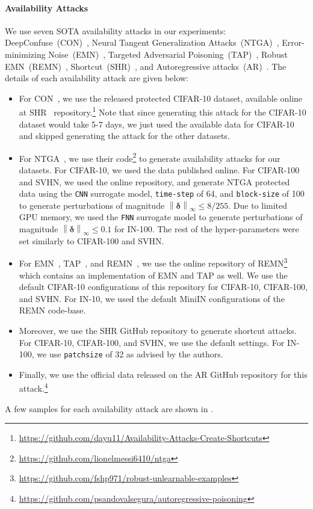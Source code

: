\documentclass[conference]{IEEEtran}
\makeatletter
\theoremstyle{definition}
\theoremstyle{remark}
\theoremstyle{proposition}
\newcommand{\norm}[1]{\left\lVert#1\right\rVert}
\newcommand\footnoteref[1]{\protected@xdef\@thefnmark{\ref{#1}}\@footnotemark}
\makeatother
\begin{document}
\paragraph{Availability Attacks}
We use seven SOTA availability attacks in our experiments: DeepConfuse~(CON)~\citep{feng2019con}, Neural Tangent Generalization Attacks~(NTGA)~\citep{yuan2021ntga}, Error-minimizing Noise~(EMN)~\citep{huang2021emn}, Targeted Adversarial Poisoning~(TAP)~\citep{fowl2021tap}, Robust EMN~(REMN)~\citep{fu2022remn}, Shortcut~(SHR)~\citep{geirhos2020shortcut}, and Autoregressive attacks~(AR)~\citep{sandoval2022ar}.
The details of each availability attack are given below:
\begin{itemize}
    \item For CON~\citep{feng2019con}, we use the released protected CIFAR-10 dataset, available online at SHR~\citep{yu2022shr} repository.\footnote{\label{shr_repo}\url{https://github.com/dayu11/Availability-Attacks-Create-Shortcuts}}
    Note that since generating this attack for the CIFAR-10 dataset would take 5-7 days, we just used the available data for CIFAR-10 and skipped generating the attack for the other datasets.
    \item For NTGA~\citep{yuan2021ntga}, we use their code\footnote{\url{https://github.com/lionelmessi6410/ntga}} to generate availability attacks for our datasets.
    For CIFAR-10, we used the data published online.
    For CIFAR-100 and SVHN, we used the online repository, and generate NTGA protected data using the \texttt{CNN} surrogate model, \texttt{time-step} of 64, and \texttt{block-size} of 100 to generate perturbations of magnitude $\norm{\boldsymbol{\delta}}_{\infty} \leq 8/255$.
    Due to limited GPU memory, we used the \texttt{FNN} surrogate model to generate perturbations of magnitude $\norm{\boldsymbol{\delta}}_{\infty} \leq 0.1$  for IN-100.
    The rest of the hyper-parameters were set similarly to CIFAR-100 and SVHN.
    \item For EMN~\citep{huang2021emn}, TAP~\citep{fowl2021tap}, and REMN~\citep{fu2022remn}, we use the online repository of REMN\footnote{\url{https://github.com/fshp971/robust-unlearnable-examples}} which contains an implementation of EMN and TAP as well.
    We use the default CIFAR-10 configurations of this repository for CIFAR-10, CIFAR-100, and SVHN.
    For IN-10, we used the default MiniIN configurations of the REMN code-base.
    \item Moreover, we use the SHR GitHub repository\footnoteref{shr_repo} to generate shortcut attacks.
    For CIFAR-10, CIFAR-100, and SVHN, we use the default settings.
    For IN-100, we use \texttt{patchsize} of 32 as advised by the authors.
    \item Finally, we use the official data released on the AR GitHub repository for this attack.\footnote{\url{https://github.com/psandovalsegura/autoregressive-poisoning}}
\end{itemize}
A few samples for each availability attack are shown in .
\end{document}

